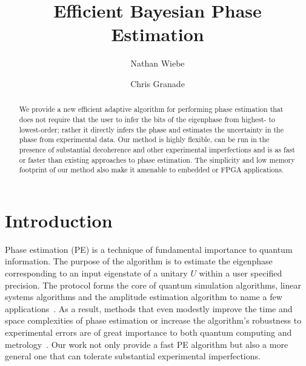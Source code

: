 \documentclass[aps,pra,amsmath,twocolumn,amssymb,superscriptaddress]{revtex4-1}
\begin{document}

\title{Efficient Bayesian Phase Estimation}
\author{Nathan Wiebe}

\author{Chris Granade}

\begin{abstract}
    We provide a new efficient adaptive algorithm for performing phase estimation that does not require that the user to infer the bits of the eigenphase from highest- to lowest-order; rather
it directly infers the phase and estimates the uncertainty in the phase from experimental data.  Our method is 
highly flexible, can be run in the presence of substantial decoherence and other experimental imperfections and is as fast or faster than existing approaches to
phase estimation.  The
simplicity and low memory footprint of our method also make it amenable to embedded  or FPGA applications. 
\end{abstract}

\maketitle

\section{Introduction}
\label{sec:intro}

Phase estimation (PE) is a technique of fundamental importance to quantum information.  The purpose of the algorithm is to estimate the eigenphase corresponding to an input eigenstate of a unitary $U$ within a user specified precision.  The protocol forms the core of quantum simulation algorithms, linear systems algorithms and the amplitude estimation algorithm to name a few applications~\cite{shor_polynomial-time_1995,BHM+02,ADL+05,harrow2009quantum,lanyon2010towards}.  As a result, methods that even modestly improve the time and space complexities of phase estimation or increase the algorithm's robustness to experimental errors are of great importance to both quantum computing and metrology~\cite{Kit96,kitaev2002classical,higgins2007entanglement,SHF14}.  Our work not only provide a fast PE algorithm but also a more general one that can tolerate substantial experimental imperfections.
\end{document}
